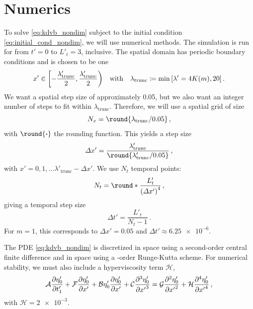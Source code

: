 \documentclass{jfm}
\DeclarePairedDelimiter{\round}\lfloor\rceil
\begin{document}
\section{Numerics}
To solve \cref{eq:kdvb_nondim} subject to the initial condition
\cref{eq:initial_cond_nondim}, we will use numerical methods.
The simulation is run for from $t'= 0$ to $L'_t = 3$, inclusive.
The spatial domain has periodic boundary conditions and is chosen to be
one
\begin{equation}
  x' \in \biggl[-\frac{\lambda_{\text{trunc}}'}{2},
    \frac{\lambda'_{\text{trunc}}}{2} \biggr)
  \qq{with}
  \lambda_{\text{trunc}} \coloneqq \min \bqty{\lambda'=4K(m) , 20} \,.
\end{equation}
We want a spatial step size of approximately \num{0.05}, but we also
want an integer number of steps to fit within $\lambda_{\text{trunc}}$.
Therefore, we will use a spatial grid of size
\begin{equation}
  N_x = \round{\lambda_{\text{trunc}}/0.05} \,,
\end{equation}
with $\round{\vdot}$ the rounding function.
This yields a step size
\begin{equation}
  \Delta x' = \frac{\lambda'_{\text{trunc}}}
    {\round{\lambda'_{\text{trunc}}/0.05}} \,,
\end{equation}
with $x' = 0, 1, \ldots \lambda'_{\text{trunc}} - \Delta x'$.
We use $N_t$ temporal points:
\begin{equation}
  N_t =  \round*{\frac{L'_t}{\pqty{\Delta x'}^4}} \,,
\end{equation}
giving a temporal step size
\begin{equation}
  \Delta t' = \frac{L'_t}{N_t -1} \,.
\end{equation}
For $m=1$, this corresponds to $\Delta x' = \num{0.05}$ and $\Delta t'
\approx \num{6.25e-6}$.

The PDE \cref{eq:kdvb_nondim} is discretized in space using a
second-order central finite difference and in space using a
-order Runge-Kutta scheme.
For numerical stability, we must also include a hyperviscosity term
$\mathcal{H}$,
\begin{equation}
  \mathcal{A} \pdv{\eta'_0}{t'_1} + \mathcal{F} \pdv{\eta'_0}{x'} + \mathcal{B}
  \eta'_0 \pdv{\eta'_0}{x'} + \mathcal{C} \pdv[3]{\eta'_0}{{x'}} =
  \mathcal{G} \pdv[2]{\eta'_0}{{x'}} + \mathcal{H}
  \pdv[4]{\eta'_0}{{x'}} \,,
\end{equation}
with $\mathcal{H} = \num{2e-3}$.
\end{document}
